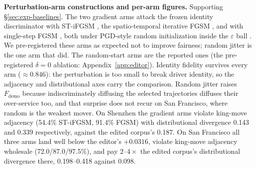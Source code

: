 \textbf{Perturbation-arm constructions and per-arm figures.} Supporting
\S\ref{sec:exp-baselines}. The two gradient arms attack the frozen identity
discriminator with ST-iFGSM \cite{hu2023stifgsm}, the spatio-temporal
iterative FGSM \cite{kurakin2017ifgsm}, and with single-step FGSM
\cite{goodfellow2015fgsm}, both under PGD-style random initialization inside
the $\varepsilon$ ball \cite{madry2018pgd}. We pre-registered these arms as
expected not to improve fairness; random jitter is the one arm that did.
The random-start arms are the reported
ones (the pre-registered $\delta = 0$ ablation:
Appendix~\ref{app:editor}). Identity fidelity survives every arm
($\approx 0.846$): the perturbation is too small to break driver identity, so
the adjacency and distributional axes carry the comparison. Random jitter
raises $F_{\mathrm{demo}}$ because indiscriminately diffusing the selected
trajectories diffuses their over-service too, and that surprise does not recur
on San Francisco, where random is the weakest mover.
On Shenzhen the gradient arms violate king-move adjacency (54.4\% ST-iFGSM,
91.4\% FGSM) with distributional divergence 0.143 and 0.339 respectively,
against the edited corpus's 0.187.
On San Francisco all three arms land well below the editor's $+0.0316$,
violate king-move adjacency wholesale (72.0/87.0/97.5\%), and pay
$2$--$4\times$ the edited corpus's distributional divergence there,
0.198--0.418 against 0.098.


